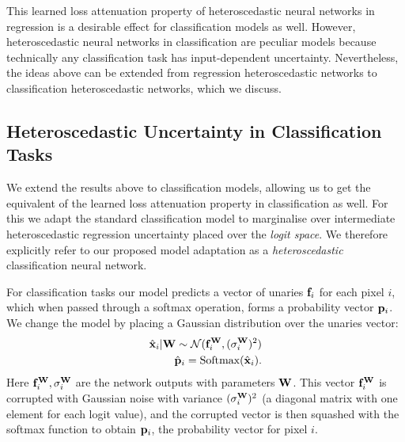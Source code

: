 This learned loss attenuation property of heteroscedastic neural networks in regression is a desirable effect for classification models as well. 
However, heteroscedastic neural networks in classification are peculiar models because technically any classification task has input-dependent uncertainty. Nevertheless, the ideas above can be extended from regression heteroscedastic networks to classification heteroscedastic networks, which we discuss.


\subsection{Heteroscedastic Uncertainty in Classification Tasks}

We extend the results above to classification models, allowing us to get the equivalent of the learned loss attenuation property in classification as well.
For this we adapt the standard classification model to marginalise over intermediate heteroscedastic regression uncertainty placed over the \textit{logit space}.
We therefore explicitly refer to our proposed model adaptation as a \textit{heteroscedastic} classification neural network.

For classification tasks our model predicts a vector of unaries $\mathbf{f}_i$ for each pixel $i$, which when passed through a softmax operation, forms a probability vector $\mathbf{p}_i$. We change the model by placing a Gaussian distribution over the unaries vector:
\begin{equation}
\begin{split}
\hat{\mathbf{x}}_i | \mathbf{W} \sim \mathcal{N}(\mathbf{f}^{\mathbf{W}}_i, (\sigma_i^{\mathbf{W}})^2)
\\
\hat{\mathbf{p}}_i = \text{Softmax}(\hat{\mathbf{x}}_i).
\end{split}
\end{equation}
Here $\mathbf{f}^{\mathbf{W}}_i, \sigma_i^{\mathbf{W}}$ are the network outputs with parameters $\mathbf{W}$.
This vector $\mathbf{f}^{\mathbf{W}}_i$ is corrupted with Gaussian noise with variance $(\sigma_i^{\mathbf{W}})^2$ (a diagonal matrix with one element for each logit value), and the corrupted vector is then squashed with the softmax function to obtain $\mathbf{p}_i$, the probability vector for pixel $i$.


